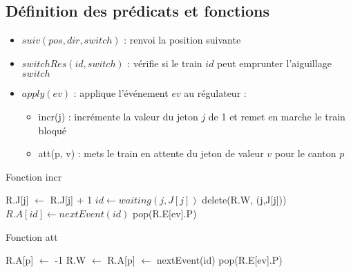 \documentclass[12pt]{article}
\begin{document}
\subsection{Définition des prédicats et fonctions}

\begin{itemize}
    \item $suiv(pos, dir, switch)$ : renvoi la position suivante 
    \item $switchRes(id, switch)$ : vérifie si le train $id$ peut emprunter l'aiguillage $switch$
    \item $apply(ev)$ : applique l'événement $ev$ au régulateur : 
    \begin{itemize}
        \item incr(j) : incrémente la valeur du jeton $j$ de 1 et remet en marche le train bloqué
        \item att(p, v) : mets le train en attente du jeton de valeur $v$ pour le canton $p$
    \end{itemize}
\end{itemize}

\begin{algorithm}
\caption{Fonction incr}
    \begin{algorithmic}[1]
         
            \State R.J[j] $\gets$ R.J[j] + 1
            \State $id \gets waiting(j,J[j])$ 
                \State delete(R.W, (j,J[j])) 
                \State $R.A[id] \gets nextEvent(id)$  
            \EndIf
            \State pop(R.E[ev].P) 
        \EndFunction
    \end{algorithmic}
\end{algorithm}


\begin{algorithm}
    \caption{Fonction att}
        \begin{algorithmic}[2]
         
                \State R.A[p] $\gets$ -1
                \State R.W $\gets$  
            \Else {}
                \State R.A[p] $\gets$ nextEvent(id)
            \EndIf
            \State pop(R.E[ev].P) 
        \EndFunction
    \end{algorithmic}
\end{algorithm}
\end{document}
